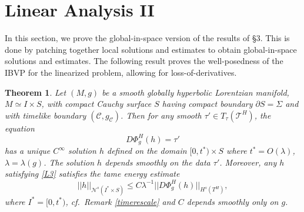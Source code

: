 \documentclass[10pt]{amsart}
\newcommand{\Si}{\Sigma}
\renewcommand{\l}{\lambda}
\newcommand{\cC}{{\mathcal C}}
\newcommand{\cT}{{\mathcal T}}
\newcommand{\cN}{{\mathcal N}}
\newcommand{\be}{\begin{equation}}
\newcommand{\ee}{\end{equation}}
\newcommand{\p}{\partial}
\newcommand{\<}{\langle}
\renewcommand{\>}{\rangle}
\theoremstyle{plain}
\newtheorem{theorem}[lemma]{Theorem}
\theoremstyle{remark}
\theoremstyle{definition}
\numberwithin{equation}{section}
\begin{document}
 \section{Linear Analysis II}

 In this section, we prove the global-in-space version of the results of \S 3. This is done by patching together local solutions and estimates to obtain 
 global-in-space solutions and estimates. The following result proves the well-posedness of the IBVP for the linearized problem, allowing for loss-of-derivatives. 

  
\begin{theorem}\label{globexist}
Let $(M, g)$ be a smooth globally hyperbolic Lorentzian manifold, $M \simeq I \times S$, with compact Cauchy surface $S$ having compact boundary 
$\p S = \Si$ and with timelike boundary $(\cC, g_{\cC})$. Then for any smooth 
$\tau' \in T_{\tau}(\cT^H)$, the equation 
\be \label{L3}
D\Phi_g^H(h) = \tau'
\ee
has a unique $C^{\infty}$ solution $h$ defined on the domain $[0, t^*)\times S$ where $t^* = O(\l)$, $\l = \l(g)$. The solution $h$ depends 
smoothly on the data $\tau'$. Moreover, any $h$ satisfying \eqref{L3} satisfies the tame energy estimate 
\be \label{Eest2}
||h||_{\cN^s(I^*\times S)}  \leq C\l^{-1}||D\Phi_g^H(h)||_{H^s(T^H)}, 
\ee
where $I^* = [0, t^*)$, cf.~Remark \ref{timerescale} and $C$ depends smoothly only on $g$. 
\end{theorem} 
 
\end{document}
